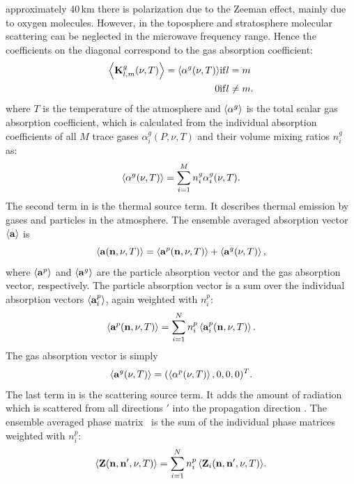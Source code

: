 approximately 40\,km there is polarization due to the Zeeman effect,
mainly due to oxygen molecules.  However, in the toposphere and
stratosphere molecular scattering can be neglected in the microwave
frequency range. Hence the coefficients on the diagonal correspond to
the gas absorption coefficient:
\begin{eqnarray}
\left\langle {\bf K}^{g}_{l,m}(\nu, T) \right\rangle =
\left\langle \alpha^g(\nu, T) \right\rangle & \mathrm{if } l = m \\
0 & \mathrm{if } l \neq m.
\end{eqnarray}
where $T$ is the temperature of the atmosphere and $\left\langle  \alpha^g
 \right\rangle$ is the total scalar gas absorption coefficient, which is
calculated from the individual absorption coefficients of all $M$
trace gases $\alpha_i^g(P, \nu, T)$ and their volume mixing ratios
$n^g_i$ as:
\begin{equation}
   \left\langle  \alpha^g(\nu, T)  \right\rangle =  \sum_{i=1}^M  n^g_i \alpha_i^g(\nu, T).
\end{equation}
The second term in  is the thermal source term. It
describes thermal emission by gases and particles in the atmosphere.
The ensemble averaged absorption vector $\left\langle {\bf a} \right\rangle$ is
\begin{equation}
  \left\langle {\bf a} ({\bf n}, \nu, T) \right\rangle  =
  \left\langle {\bf a}^{p} ({\bf n}, \nu, T) \right\rangle +
  \left\langle  {\bf a}^{g} (\nu, T)  \right\rangle,
\end{equation}
where $\left\langle {\bf a}^{p} \right\rangle$ and $\left\langle  {\bf a}^{g}  \right\rangle$
are the particle absorption vector and the gas absorption vector,
respectively.  The particle absorption vector is a sum over the
individual absorption vectors $\left\langle  {\bf a}_i^p  \right\rangle $, again
weighted with $n^p_i$:
\begin{equation}
  \left\langle {\bf a}^{p}({\bf n}, \nu, T) \right\rangle = \sum_{i=1}^N n^p_i \left\langle {\bf a}_i^p ({\bf n}, \nu, T) \right\rangle.
\label{eq:rtetheory:abs_vec_p}
\end{equation}
The gas absorption vector is simply
\begin{equation}
 \left\langle  {\bf a}^{g}(\nu, T)  \right\rangle  = (\left\langle \alpha^p(\nu, T) \right\rangle, 0, 0, 0)^T.
\end{equation}
The last term in  is the scattering source term.
It adds the amount of radiation which is scattered from all directions
\PDir$'$ into the propagation direction \PDir.  The ensemble
averaged phase matrix \EnsAvr\PhaMat\ is the sum of the individual
phase matrices  weighted with $n^p_i$:
\begin{equation}
  \left\langle {\bf Z}({\bf n}, {\bf n}', \nu, T) \right\rangle = 
  \sum_{i=1}^N {n^p_i\left\langle {\bf Z}_i({\bf n},
    {\bf n}', \nu, T) \right\rangle}.
  \label{eq:rtetheory:pha_mat}
\end{equation}

